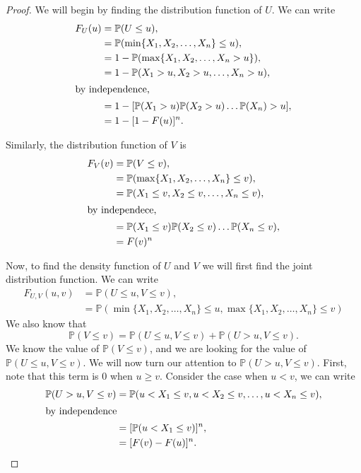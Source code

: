 \documentclass{article}
\renewcommand{\P}[1]{\mathbb{P}(#1)}
\begin{document}
\begin{proof}
    We will begin by finding the distribution function of $U$.
    We can write
    \begin{align*}
        F_U(u) & = \P{U \leq u},                                \\
               & = \P{\min\{X_1,X_2,\dots,X_n\} \leq u},        \\
               & = 1 - \P{\max\{X_1,X_2,\dots,X_n > u\}},       \\
               & = 1 - \P{X_1 > u, X_2 > u,\dots,X_n > u},      \\
        \intertext{by independence,}
               & = 1 -[\P{X_1 > u}\P{X_2 > u}\dots\P{X_n} > u], \\
               & = 1 - [1 - F(u)]^n.
    \end{align*}

    Similarly, the distribution function of $V$ is
    \begin{align*}
        F_V(v) & = \P{V \leq v},                                    \\
               & = \P{\max\{X_1,X_2,\dots,X_n\} \leq v},            \\
               & = \P{X_1 \leq v, X_2 \leq v,\dots,X_n \leq v},     \\
        \intertext{by independece,}
               & = \P{X_1 \leq v}\P{X_2 \leq v}\dots\P{X_n \leq v}, \\
               & = F(v)^n
    \end{align*}

    Now, to find the density function of $U$ and $V$ we will first
    find the joint distribution function. We can write
    \begin{align*}
        F_{U,V}(u,v) & = \P{U \leq u, V \leq v},              \\
                     & = \P{\min\{X_1,X_2,\dots,X_n\} \leq u,
            \max\{X_1,X_2,\dots,X_n\} \leq v}
    \end{align*}
    We also know that
    \begin{equation}
        \P{V \leq v} = \P{U\leq u, V \leq v} + \P{U > u, V \leq v}.
    \end{equation}
    We know the value of $\P{V \leq v}$, and we are looking for the value
    of ${\P{U \leq u, V \leq v}}$. We will now turn our attention to
    $\P{U > u, V \leq v}$. First, note that this term is $0$ when
    $u \geq v$. Consider the case when $u < v$, we can write
    \begin{align*}
        \P{U > u, V \leq v} & = \P{u < X_1 \leq v, u < X_2 \leq v,\dots, u < X_n \leq v}, \\
        \intertext{by independence}
                            & = [\P{u < X_1 \leq v}]^n,                                   \\
                            & = [F(v) - F(u)]^n.
    \end{align*}


\end{proof}
\end{document}
